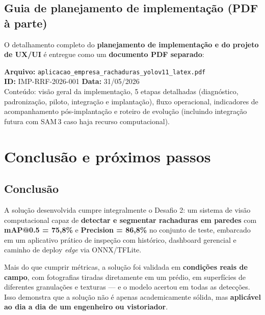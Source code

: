 \documentclass[11pt,a4paper]{article}
\begin{document}
\subsection{Guia de planejamento de implementação (PDF à parte)}
O detalhamento completo do \textbf{planejamento de implementação e do projeto de UX/UI} é
entregue como um \textbf{documento PDF separado}:
\begin{infobox}
\textbf{Arquivo:} \texttt{aplicacao\_empresa\_rachaduras\_yolov11\_latex.pdf}\\
\textbf{ID:} IMP-RRF-2026-001 \quad \textbf{Data:} 31/05/2026\\
Conteúdo: visão geral da implementação, 5 etapas detalhadas (diagnóstico, padronização,
piloto, integração e implantação), fluxo operacional, indicadores de acompanhamento pós-implantação
e roteiro de evolução (incluindo integração futura com SAM\,3 caso haja recurso computacional).
\end{infobox}

\section{Conclusão e próximos passos}

\subsection{Conclusão}

A solução desenvolvida cumpre integralmente o Desafio 2: um sistema de visão computacional
capaz de \textbf{detectar e segmentar rachaduras em paredes} com \textbf{mAP@0.5 = 75,8\%} e
\textbf{Precision = 86,8\%} no conjunto de teste, embarcado em um aplicativo prático de
inspeção com histórico, dashboard gerencial e caminho de deploy \emph{edge} via ONNX/TFLite.

Mais do que cumprir métricas, a solução foi validada em \textbf{condições reais de campo},
com fotografias tiradas diretamente em um prédio, em superfícies de diferentes granulações e
texturas — e o modelo acertou em todas as detecções. Isso demonstra que a solução não é apenas
academicamente sólida, mas \textbf{aplicável ao dia a dia de um engenheiro ou vistoriador}.
\end{document}
